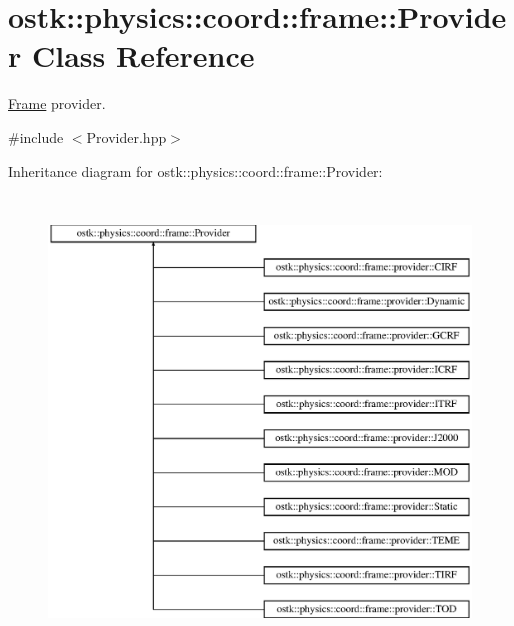 \hypertarget{classostk_1_1physics_1_1coord_1_1frame_1_1_provider}{}\section{ostk\+:\+:physics\+:\+:coord\+:\+:frame\+:\+:Provider Class Reference}
\label{classostk_1_1physics_1_1coord_1_1frame_1_1_provider}


\hyperlink{classostk_1_1physics_1_1coord_1_1_frame}{Frame} provider.  




{\ttfamily \#include $<$Provider.\+hpp$>$}

Inheritance diagram for ostk\+:\+:physics\+:\+:coord\+:\+:frame\+:\+:Provider\+:\begin{figure}[H]
\begin{center}
\leavevmode
\includegraphics[height=12.000000cm]{classostk_1_1physics_1_1coord_1_1frame_1_1_provider}
\end{center}
\end{figure}
